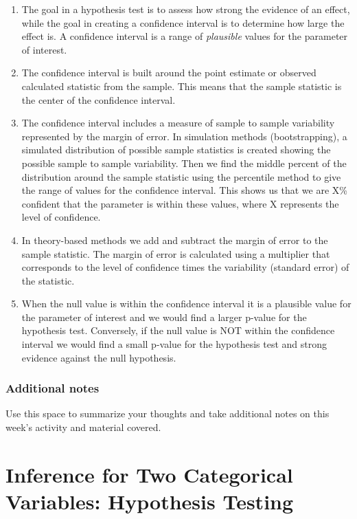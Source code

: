 \documentclass[
]{report}
\begin{document}
\begin{enumerate}
\def\labelenumi{\arabic{enumi}.}
\item
  The goal in a hypothesis test is to assess how strong the evidence of an effect, while the goal in creating a confidence interval is to determine how large the effect is. A confidence interval is a range of \emph{plausible} values for the parameter of interest.
\item
  The confidence interval is built around the point estimate or observed calculated statistic from the sample. This means that the sample statistic is the center of the confidence interval.
\item
  The confidence interval includes a measure of sample to sample variability represented by the margin of error. In simulation methods (bootstrapping), a simulated distribution of possible sample statistics is created showing the possible sample to sample variability. Then we find the middle percent of the distribution around the sample statistic using the percentile method to give the range of values for the confidence interval. This shows us that we are X\% confident that the parameter is within these values, where X represents the level of confidence.
\item
  In theory-based methods we add and subtract the margin of error to the sample statistic. The margin of error is calculated using a multiplier that corresponds to the level of confidence times the variability (standard error) of the statistic.
\item
  When the null value is within the confidence interval it is a plausible value for the parameter of interest and we would find a larger p-value for the hypothesis test. Conversely, if the null value is NOT within the confidence interval we would find a small p-value for the hypothesis test and strong evidence against the null hypothesis.
\end{enumerate}

\hypertarget{additional-notes-6}{%
\subsection{Additional notes}\label{additional-notes-6}}

Use this space to summarize your thoughts and take additional notes on this week's activity and material covered.

\hypertarget{inference-for-two-categorical-variables-hypothesis-testing}{%
\chapter{Inference for Two Categorical Variables: Hypothesis Testing}\label{inference-for-two-categorical-variables-hypothesis-testing}}
\end{document}
